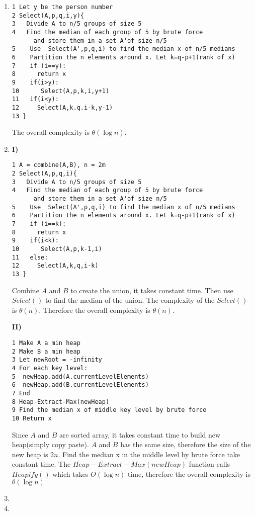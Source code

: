 \documentclass{article}
\begin{document}
\begin{enumerate}
\item
\begin{verbatim}
1 Let y be the person number
2 Select(A,p,q,i,y){
3   Divide A to n/5 groups of size 5
4   Find the median of each group of 5 by brute force
      and store them in a set A'of size n/5
5    Use  Select(A',p,q,i) to find the median x of n/5 medians
6    Partition the n elements around x. Let k=q-p+1(rank of x)
7    if (i==y):
8      return x
9    if(i>y):
10      Select(A,p,k,i,y+1)
11   if(i<y):
12     Select(A,k.q.i-k,y-1)
13 }
\end{verbatim}
The overall complexity is $\theta(\log n)$.

\item
{\bf I)}
\begin{verbatim}
1 A = combine(A,B), n = 2m
2 Select(A,p,q,i){
3   Divide A to n/5 groups of size 5
4   Find the median of each group of 5 by brute force
      and store them in a set A'of size n/5
5    Use  Select(A',p,q,i) to find the median x of n/5 medians
6    Partition the n elements around x. Let k=q-p+1(rank of x)
7    if (i==k):
8      return x 
9    if(i<k):
10      Select(A,p,k-1,i)
11   else:
12     Select(A,k,q,i-k)
13 }
\end{verbatim}
Combine $A$ and $B$ to create the union, it takes constant time. Then use $Select()$ to find the median of the union. The complexity of the $Select()$ is $\theta(n)$. Therefore the overall complexity is $\theta(n)$. 


{\bf II)}
\begin{verbatim}
1 Make A a min heap
2 Make B a min heap
3 Let newRoot = -infinity
4 For each key level:
5  newHeap.add(A.currentLevelElements)
6  newHeap.add(B.currentLevelElements)
7 End
8 Heap-Extract-Max(newHeap)
9 Find the median x of middle key level by brute force
10 Return x
\end{verbatim}
Since $A$ and $B$ are sorted array, it takes constant time to build new heap(simply copy paste). $A$ and $B$ has the same size, therefore the size of the new heap is $2n$. Find the median x in the middle level by brute force take constant time. The $Heap-Extract-Max(newHeap)$ function calls $Heapify()$ which takes $O(\log n)$ time, therefore the overall complexity is $\theta(\log n)$

\item
\item


\end{enumerate}
\end{document}
